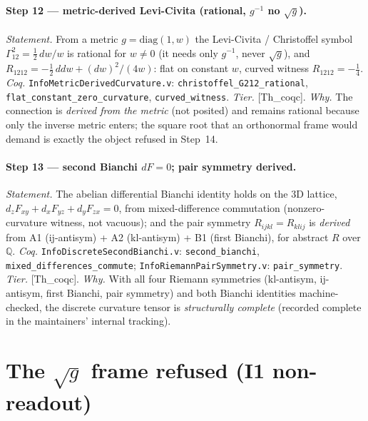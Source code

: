 \documentclass[10pt,twocolumn]{article}
\theoremstyle{definition}
\newcommand{\Thq}{\textsf{[Th\_coqc]}}   %
\newcommand{\code}[1]{\texttt{#1}}
\begin{document}
\paragraph{Step 12 --- metric-derived Levi-Civita (rational, $g^{-1}$ no $\sqrt{g}$).}
\emph{Statement.} From a metric $g=\mathrm{diag}(1,w)$ the Levi-Civita /
Christoffel symbol \cite{christoffel1869} $\Gamma^2_{12}=\tfrac12\,dw/w$ is rational for $w\neq0$ (it needs only $g^{-1}$,
never $\sqrt{g}$), and $R_{1212}=-\tfrac12\,ddw+(dw)^2/(4w)$: flat on constant
$w$, curved witness $R_{1212}=-\tfrac14$. \emph{Coq.}
\code{InfoMetricDerivedCurvature.v}: \code{christoffel\_G212\_rational},
\code{flat\_constant\_zero\_curvature}, \code{curved\_witness}. \emph{Tier.}
\Thq{}. \emph{Why.} The connection is \emph{derived from the metric} (not
posited) and remains rational because only the inverse metric enters; the square
root that an orthonormal frame would demand is exactly the object refused in
Step~14.

\paragraph{Step 13 --- second Bianchi $dF=0$; pair symmetry derived.}
\emph{Statement.} The abelian differential Bianchi identity \cite{bianchi1902}
holds on the $3$D lattice, $d_zF_{xy}+d_xF_{yz}+d_yF_{zx}=0$, from mixed-difference commutation
(nonzero-curvature witness, not vacuous); and the pair symmetry
$R_{ijkl}=R_{klij}$ is \emph{derived} from A1 (ij-antisym) + A2 (kl-antisym) +
B1 (first Bianchi), for abstract $R$ over $\mathbb{Q}$. \emph{Coq.}
\code{InfoDiscreteSecondBianchi.v}: \code{second\_bianchi},
\code{mixed\_differences\_commute}; \code{InfoRiemannPairSymmetry.v}:
\code{pair\_symmetry}. \emph{Tier.} \Thq{}. \emph{Why.} With all four Riemann
symmetries (kl-antisym, ij-antisym, first Bianchi, pair symmetry) and both
Bianchi identities machine-checked, the discrete curvature tensor is
\emph{structurally complete} (recorded complete in the maintainers' internal tracking).

\section{The $\sqrt{g}$ frame refused (I1 non-readout)}\label{sec:refusal}
\end{document}
